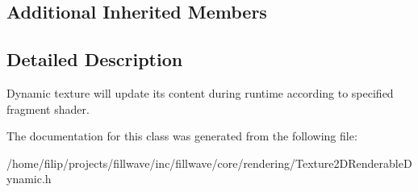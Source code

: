 \subsection*{Additional Inherited Members}


\subsection{Detailed Description}
Dynamic texture will update its content during runtime according to specified fragment shader. 

The documentation for this class was generated from the following file\+:\begin{DoxyCompactItemize}
\item 
/home/filip/projects/fillwave/inc/fillwave/core/rendering/Texture2\+D\+Renderable\+Dynamic.\+h\end{DoxyCompactItemize}
